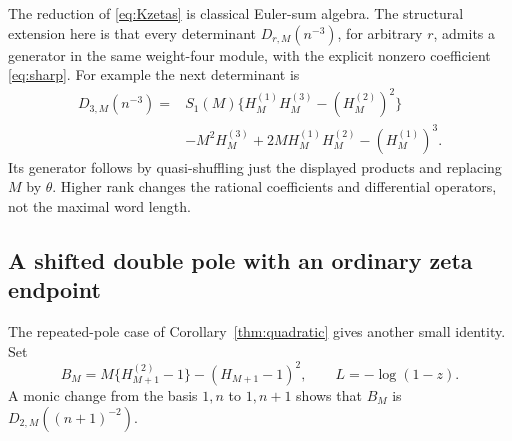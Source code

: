 \documentclass[11pt,letterpaper]{article}
\numberwithin{equation}{section}
\theoremstyle{definition}\newtheorem{definition}[theorem]{Definition}
\theoremstyle{remark}\newtheorem{remark}[theorem]{Remark}
\begin{document}
The reduction of \eqref{eq:Kzetas} is classical Euler-sum algebra. The
structural extension here is that every determinant
$D_{r,M}(n^{-3})$, for arbitrary $r$, admits a generator in the same
weight-four module, with the explicit nonzero coefficient
\eqref{eq:sharp}. For example the next determinant is
\begin{equation}\label{eq:triple-r3}
 \begin{split}
 D_{3,M}(n^{-3})={}&S_1(M)
       \{H_M^{(1)}H_M^{(3)}-(H_M^{(2)})^2\}\\
 &-M^2H_M^{(3)}+2M H_M^{(1)}H_M^{(2)}-(H_M^{(1)})^3.
 \end{split}
\end{equation}
Its generator follows by quasi-shuffling just the displayed products
and replacing $M$ by $\theta$. Higher rank changes the rational
coefficients and differential operators, not the maximal word length.

\subsection{A shifted double pole with an ordinary zeta endpoint}

The repeated-pole case of Corollary~\ref{thm:quadratic} gives another
small identity. Set
\[
 B_M=M\{H_{M+1}^{(2)}-1\}-(H_{M+1}-1)^2,
 \qquad L=-\log(1-z).
\]
A monic change from the basis $1,n$ to $1,n+1$ shows that $B_M$ is
$D_{2,M}((n+1)^{-2})$.
\end{document}
